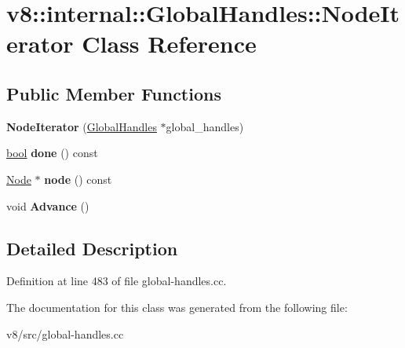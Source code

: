 \hypertarget{classv8_1_1internal_1_1GlobalHandles_1_1NodeIterator}{}\section{v8\+:\+:internal\+:\+:Global\+Handles\+:\+:Node\+Iterator Class Reference}
\label{classv8_1_1internal_1_1GlobalHandles_1_1NodeIterator}
\subsection*{Public Member Functions}
\begin{DoxyCompactItemize}
\item 
\mbox{\label{classv8_1_1internal_1_1GlobalHandles_1_1NodeIterator_aecbfa8d72760a3e1cd195b42dac1f26d}} 
{\bfseries Node\+Iterator} (\mbox{\hyperlink{classv8_1_1internal_1_1GlobalHandles}{Global\+Handles}} $\ast$global\+\_\+handles)
\item 
\mbox{\label{classv8_1_1internal_1_1GlobalHandles_1_1NodeIterator_a278fee6263521b1465a0c4395763fbe9}} 
\mbox{\hyperlink{classbool}{bool}} {\bfseries done} () const
\item 
\mbox{\label{classv8_1_1internal_1_1GlobalHandles_1_1NodeIterator_ab4205ed2ef3fae02de85d2f4bf5b8905}} 
\mbox{\hyperlink{classv8_1_1internal_1_1GlobalHandles_1_1Node}{Node}} $\ast$ {\bfseries node} () const
\item 
\mbox{\label{classv8_1_1internal_1_1GlobalHandles_1_1NodeIterator_a9b743acba4104988ae3f9a4db985133d}} 
void {\bfseries Advance} ()
\end{DoxyCompactItemize}


\subsection{Detailed Description}


Definition at line 483 of file global-\/handles.\+cc.



The documentation for this class was generated from the following file\+:\begin{DoxyCompactItemize}
\item 
v8/src/global-\/handles.\+cc\end{DoxyCompactItemize}
